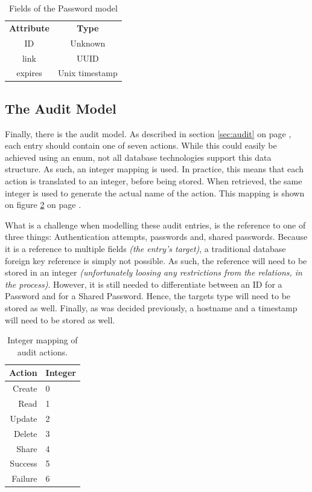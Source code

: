 			\begin{table}[p]
				\centering
				\begin{tabular}{c|c}
					\textbf{Attribute} 		& \textbf{Type} 		\\
					ID 						& Unknown 		\\
					link  					& UUID \\
					expires 				& Unix timestamp \\
				\end{tabular}
				\caption{Fields of the Password model}
				\label{fig:model:invite}
			\end{table}

		\subsection{The Audit Model}
			\label{sec:moddeling:audit}
			Finally, there is the audit model. As described in section \ref{sec:audit} on page \pageref{sec:audit}, each entry should contain one of seven actions. While this could easily be achieved using an enum, not all database technologies support this data structure. As such, an integer mapping is used. In practice, this means that each action is translated to an integer, before being stored. When retrieved, the same integer is used to generate the actual name of the action. This mapping is shown on figure \ref{table:audit:actionmapping} on page \pageref{table:audit:actionmapping}.

			What is a challenge when modelling these audit entries, is the reference to one of three things: Authentication attempts, passwords and, shared passwords. Because it is a reference to multiple fields \emph{(the entry's target)}, a traditional database foreign key reference is simply not possible. As such, the reference will need to be stored in an integer \emph{(unfortunately loosing any restrictions from the relations, in the process)}. However, it is still needed to differentiate between an ID for a Password and for a Shared Password. Hence, the targets type will need to be stored as well. Finally, as was decided previously, a hostname and a timestamp will need to be stored as well.

			\begin{table}[h!]
				\centering
				\begin{tabular}{r | l}
					\textbf{Action} 	& \textbf{Integer} 	\\
					\hline
					Create 				& 0 				\\
					Read 				& 1 				\\
					Update 				& 2 				\\
					Delete 				& 3 				\\
					Share 				& 4 				\\
					Success 			& 5 				\\
					Failure 			& 6 				\\					
				\end{tabular}
				\caption{Integer mapping of audit actions.}
				\label{table:audit:actionmapping}
			\end{table}

